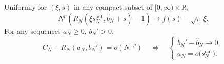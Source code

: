 \begin{theorem}
\label{eul:thm:joint-profile}
Uniformly for $(\xi,s)$ in any compact subset of
$[0,\infty)\times\mathbb R$,
\begin{equation}\label{eul:eq:joint-profile}
 N^p\left(R_N(\xi s_N^{\mathrm{out}},\widehat b_N+s)-1\right)
       \longrightarrow f(s)-\sqrt\pi\,\xi.
\end{equation}
For any sequences $a_N\geq0$, $b_N'>0$,
\begin{equation}\label{eul:eq:near-iff}
 C_N-R_N(a_N,b_N')=o(N^{-p})
 \quad\Longleftrightarrow\quad
 \begin{cases}
 b_N'-\widehat b_N\longrightarrow0,\\
 a_N=o\bigl(s_N^{\mathrm{out}}\bigr).
 \end{cases}
\end{equation}
\end{theorem}
